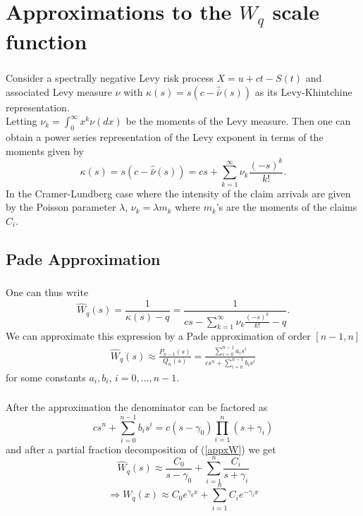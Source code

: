 \documentclass[xcolor=pdftex,dvipsnames,table]{beamer}
\theoremstyle{definition}
\begin{document}
\section{Approximations to the $W_q$ scale function}
\begin{frame}
\frametitle{\insertsectionhead}
Consider a spectrally negative Levy risk process $X = u + ct - S(t)$ and associated Levy measure $\nu$ with $\kappa(s) = s(c- \hat{\bar{\nu}} (s))$ as its Levy-Khintchine representation.\\

Letting $\nu_k = \int_{0}^{\infty} x^k \nu(dx)$ be the moments of the Levy measure. Then one can obtain a power series representation of the Levy exponent in terms of the moments given by
\[
\kappa(s) = s(c- \hat{\bar{\nu}} (s)) = cs + \sum_{k=1}^{\infty} \nu_k \frac{(-s)^k}{k!}.
\]
In the Cramer-Lundberg case where the intensity of the claim arrivals are given by the Poisson parameter $\lambda$, $\nu_k = \lambda m_k$ where $m_k$'s are the moments of the claims $C_i$.
\end{frame}

\subsection{Pade Approximation}
\label{PadeApproxSection}
\begin{frame}
\frametitle{\insertsectionhead}
\framesubtitle{\insertsubsectionhead}
One can thus write 
\[
\hat{W}_q(s) = \frac{1}{\kappa(s)-q} =  \frac{1}{cs - \sum_{k=1}^{\infty} \nu_k \frac{(-s)^k}{k!} - q}. 
\]
We can approximate this expression by a Pade approximation of order $[n-1,n]$
\begin{align}
\label{appxW}
\hat{W}_q(s) \approx \frac{P_{n-1}(s)}{Q_{n}(s)} = \frac{\sum_{i=0}^{n-1} a_i s^i}{cs^n + \sum_{i=0}^{n-1} b_i s^i}
\end{align}
for some constants $a_i, b_i$, $i=0, \ldots, n-1$.
\end{frame}


\begin{frame}
\frametitle{\insertsectionhead}
\framesubtitle{\insertsubsectionhead}
After the approximation the denominator can be factored as
\[
cs^n + \sum_{i=0}^{n-1} b_i s^i = c(s-\gamma_0) \prod_{i=1}^{n} (s+\gamma_i)
\]
and after a partial fraction decomposition of (\ref{appxW}) we get
\[
\hat{W}_q(s) \approx \frac{C_0}{s-\gamma_0} + \sum_{i=1}^{n} \frac{C_i}{s+\gamma_i}
\]
\[
\Rightarrow W_q(x) \approx C_0 e^{\gamma_0 x} + \sum_{i=1}^{n} C_i e^{-\gamma_i x}
\]
\end{frame}
\end{document}
